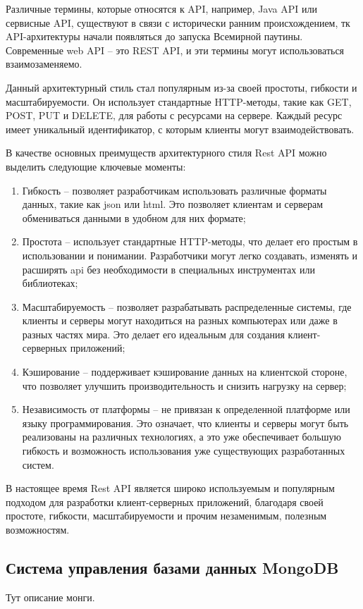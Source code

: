 \documentclass[master, och, diploma]{SCWorks}
\begin{document}
Различные термины, которые относятся к API, например, Java API или сервисные API, существуют в связи с исторически ранним происхождением, тк API-архитектуры начали появляться до запуска Всемирной паутины. Современные web API – это REST API, и эти термины могут использоваться взаимозаменяемо.

Данный архитектурный стиль стал популярным из-за своей простоты, гибкости и масштабируемости. Он использует стандартные HTTP-методы, такие как GET, POST, PUT и DELETE, для работы с ресурсами на сервере. Каждый ресурс имеет уникальный идентификатор, с которым клиенты могут взаимодействовать.

В качестве основных преимуществ архитектурного стиля Rest API можно выделить следующие ключевые моменты:
\begin{enumerate}
    \item Гибкость – позволяет разработчикам использовать различные форматы данных, такие как json или html. Это позволяет клиентам и серверам обмениваться данными в удобном для них формате;
    \item Простота – использует стандартные HTTP-методы, что делает его простым в использовании и понимании. Разработчики могут легко создавать, изменять и расширять api без необходимости в специальных инструментах или библиотеках;
    \item Масштабируемость – позволяет разрабатывать распределенные системы, где клиенты и серверы могут находиться на разных компьютерах или даже в разных частях мира. Это делает его идеальным для создания клиент-серверных приложений;
    \item Кэширование – поддерживает кэширование данных на клиентской стороне, что позволяет улучшить производительность и снизить нагрузку на сервер;
    \item Независимость от платформы – не привязан к определенной платформе или языку программирования. Это означает, что клиенты и серверы могут быть реализованы на различных технологиях, а это уже обеспечивает большую гибкость и возможность использования уже существующих разработанных систем.\cite{Masse_rest}
\end{enumerate}

В настоящее время Rest API является широко используемым и популярным подходом для разработки клиент-серверных приложений, благодаря своей простоте, гибкости, масштабируемости и прочим незаменимым, полезным возможностям.


\subsection{Система управления базами данных MongoDB}
Тут описание монги.
\end{document}
